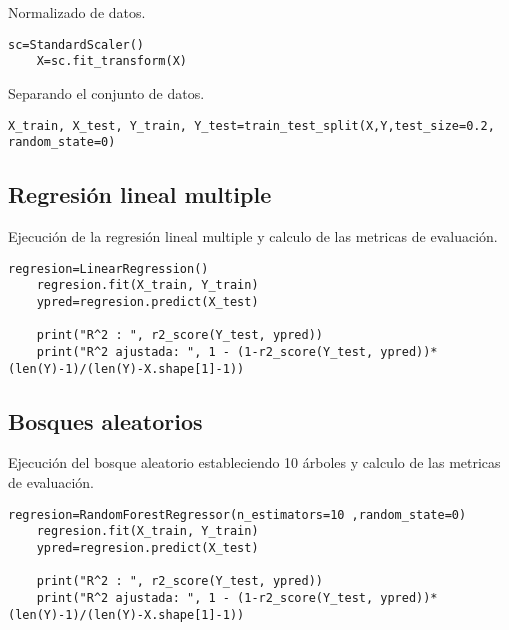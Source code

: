 \documentclass[conference]{IEEEtran}
\begin{document}
Normalizado de datos. 
\begin{lstlisting}[frame=single]
    sc=StandardScaler()
    X=sc.fit_transform(X)
\end{lstlisting}

Separando el conjunto de datos.
\begin{lstlisting}[frame=single]
    X_train, X_test, Y_train, Y_test=train_test_split(X,Y,test_size=0.2, random_state=0)
\end{lstlisting}

\subsection{Regresión lineal multiple}

Ejecución de la regresión lineal multiple y calculo de las metricas de evaluación. 
\begin{lstlisting}[frame=single]
    regresion=LinearRegression()
    regresion.fit(X_train, Y_train)
    ypred=regresion.predict(X_test)

    print("R^2 : ", r2_score(Y_test, ypred))
    print("R^2 ajustada: ", 1 - (1-r2_score(Y_test, ypred))*(len(Y)-1)/(len(Y)-X.shape[1]-1))
\end{lstlisting}

\subsection{Bosques aleatorios}
Ejecución del bosque aleatorio estableciendo 10 árboles y calculo de las metricas de evaluación. 
\begin{lstlisting}[frame=single]
    regresion=RandomForestRegressor(n_estimators=10 ,random_state=0) 
    regresion.fit(X_train, Y_train)
    ypred=regresion.predict(X_test)
    
    print("R^2 : ", r2_score(Y_test, ypred))
    print("R^2 ajustada: ", 1 - (1-r2_score(Y_test, ypred))*(len(Y)-1)/(len(Y)-X.shape[1]-1))

\end{lstlisting}
\end{document}
